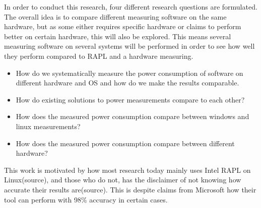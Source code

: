 In order to conduct this research, four different research questions are formulated. The overall idea is to compare different measuring software on the same hardware, but as some either requires specific hardware or claims to perform better on certain hardware, this will also be explored. This means several measuring software on several systems will be performed in order to see how well they perform compared to RAPL and a hardware measuring.


\begin{itemize}
    \item How do we systematically measure the power consumption of software on different hardware and OS and how do we make the results comparable.
    \item How do existing solutions to power measurements compare to each other?
    \item How does the measured power consumption compare between windows and linux measurements?
    \item How does the measured power consumption compare between different hardware?
\end{itemize}

This work is motivated by how most research today mainly uses Intel RAPL on Linux(source), and those who do not, has the disclaimer of not knowing how accurate their results are(source). This is despite claims from Microsoft how their tool can perform with 98\% accuracy in certain cases\cite*[]{E3WinHec}.





